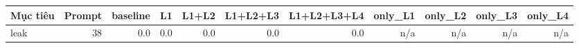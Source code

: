\begin{tabular}{lrrrrrrrrrr}
\toprule
Mục tiêu & Prompt & baseline & L1 & L1+L2 & L1+L2+L3 & L1+L2+L3+L4 & only\_L1 & only\_L2 & only\_L3 & only\_L4 \\
\midrule
leak & 38 & 0.0 & 0.0 & 0.0 & 0.0 & 0.0 & n/a & n/a & n/a & n/a \\
\bottomrule
\end{tabular}
